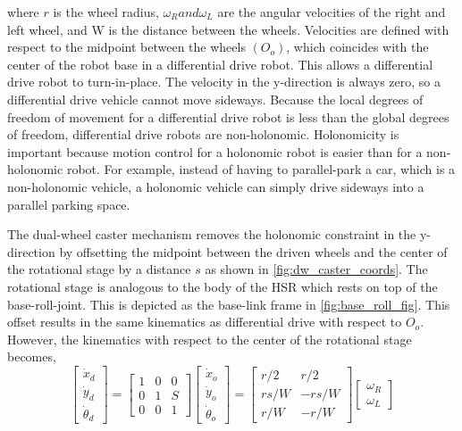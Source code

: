 \documentclass[11pt]{article}
\begin{document}
            where $r$ is the wheel radius, $\omega_{R} and \omega_{L}$ are the angular velocities of the right and left wheel, and W is the distance between the wheels. Velocities are defined with respect to the midpoint between the wheels $(O_o)$, which coincides with the center of the robot base in a differential drive robot. This allows a differential drive robot to turn-in-place. The velocity in the y-direction is always zero, so a differential drive vehicle cannot move sideways. Because the local degrees of freedom of movement for a differential drive robot is less than the global degrees of freedom, differential drive robots are non-holonomic. Holonomicity is important because motion control for a holonomic robot is easier than for a non-holonomic robot.\cite{newman_c18_2017} For example, instead of having to parallel-park a car, which is a non-holonomic vehicle, a holonomic vehicle can simply drive sideways into a parallel parking space.

            \par The dual-wheel caster mechanism removes the holonomic constraint in the y-direction by offsetting the midpoint between the driven wheels and the center of the rotational stage by a distance $s$ as shown in \cref{fig:dw_caster_coords}. The rotational stage is analogous to the body of the HSR which rests on top of the base-roll-joint. This is depicted as the base-link frame in \cref{fig:base_roll_fig}. This offset results in the same kinematics as differential drive with respect to $O_{o}$. However, the kinematics with respect to the center of the rotational stage becomes,
            \begin{equation}
                \begin{bmatrix}
                    \dot{x}_{d}\\
                    \dot{y}_{d}\\
                    \dot{\theta}_{d}
                \end{bmatrix}
                =
                \begin{bmatrix}
                    1 & 0 & 0\\
                    0 & 1 & S\\
                    0 & 0 & 1
                \end{bmatrix}
                \begin{bmatrix}
                    \dot{x}_{o}\\
                    \dot{y}_{o}\\
                    \dot{\theta}_{o}
                \end{bmatrix}
                =
                \begin{bmatrix}
                    r/2 & r/2\\
                    rs/W & -rs/W\\
                    r/W & -r/W
                \end{bmatrix}
                \begin{bmatrix}
                    \omega_{R}\\
                    \omega_{L}
                \end{bmatrix}
            \end{equation}
\end{document}
